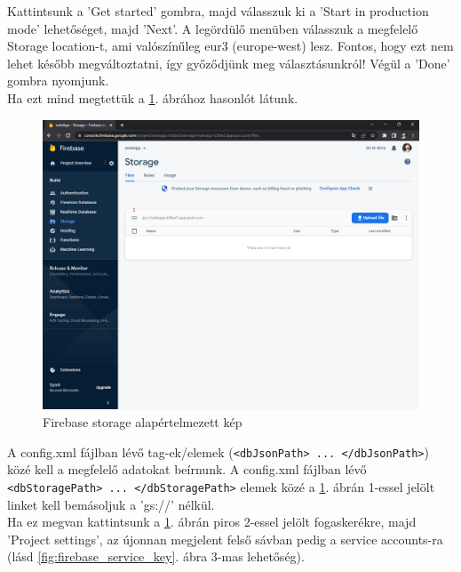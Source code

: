 \noindent Kattintsunk a 'Get started' gombra, majd válasszuk ki a 'Start in production mode' lehetőséget, majd 'Next'. A legördülő menüben válasszuk a megfelelő Storage location-t, ami valószínűleg eur3 (europe-west) lesz. Fontos, hogy ezt nem lehet később megváltoztatni, így győződjünk meg választásunkról! Végül a 'Done' gombra nyomjunk.
\vspace{5pt}\\Ha ezt mind megtettük a \ref{fig:firebase_storage_default}. ábrához hasonlót látunk.

\begin{figure}[H]
	\centering
	\includegraphics[scale=0.3]{images/config_4.png}
	\caption{Firebase storage alapértelmezett kép}
	\label{fig:firebase_storage_default}
\end{figure}

\noindent A config.xml fájlban lévő tag-ek/elemek (\texttt{<dbJsonPath> ... </dbJsonPath>}) közé kell a megfelelő adatokat beírnunk. A config.xml fájlban lévő \texttt{<dbStoragePath> ... </dbStoragePath>} elemek közé a \ref{fig:firebase_storage_default}. ábrán 1-essel jelölt linket kell bemásoljuk a 'gs://' nélkül.
\vspace{5pt}\\Ha ez megvan kattintsunk a \ref{fig:firebase_storage_default}. ábrán piros 2-essel jelölt fogaskerékre, majd 'Project settings', az újonnan megjelent felső sávban pedig a service accounts-ra (lásd \ref{fig:firebase_service_key}. ábra 3-mas lehetőség).

